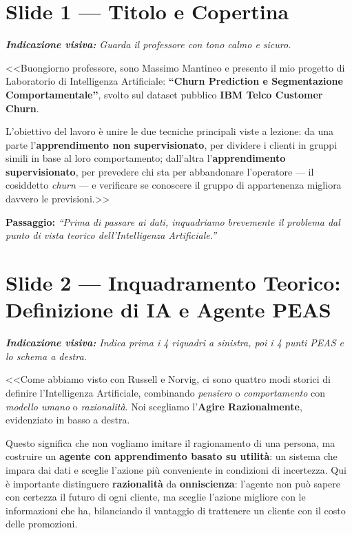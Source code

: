 \documentclass[10pt, a4paper]{article}
\newcommand{\cue}[1]{%
  \par\vspace{1pt}\noindent\colorbox{CueBg}{\parbox{\dimexpr\linewidth-2\fboxsep}{\footnotesize\textit{\color{PrimaryNavy}\textbf{Indicazione visiva:} #1}}}\par\vspace{2pt}%
}
\newcommand{\transition}[1]{%
  \par\vspace{1pt}\noindent\colorbox{LightBg}{\parbox{\dimexpr\linewidth-2\fboxsep}{\small\textbf{\color{SecondaryBlue}Passaggio:} \textit{``#1''}}}\par\vspace{2pt}%
}
\begin{document}
\section*{Slide 1 --- Titolo e Copertina}
\cue{Guarda il professore con tono calmo e sicuro.}
\noindent <<Buongiorno professore, sono Massimo Mantineo e presento il mio progetto di Laboratorio di Intelligenza Artificiale: \textbf{``Churn Prediction e Segmentazione Comportamentale''}, svolto sul dataset pubblico \textbf{IBM Telco Customer Churn}.

L'obiettivo del lavoro è unire le due tecniche principali viste a lezione: da una parte l'\textbf{apprendimento non supervisionato}, per dividere i clienti in gruppi simili in base al loro comportamento; dall'altra l'\textbf{apprendimento supervisionato}, per prevedere chi sta per abbandonare l'operatore --- il cosiddetto \textit{churn} --- e verificare se conoscere il gruppo di appartenenza migliora davvero le previsioni.>>
\transition{Prima di passare ai dati, inquadriamo brevemente il problema dal punto di vista teorico dell'Intelligenza Artificiale.}

\section*{Slide 2 --- Inquadramento Teorico: Definizione di IA e Agente PEAS}
\cue{Indica prima i 4 riquadri a sinistra, poi i 4 punti PEAS e lo schema a destra.}
\noindent <<Come abbiamo visto con Russell e Norvig, ci sono quattro modi storici di definire l'Intelligenza Artificiale, combinando \textit{pensiero} o \textit{comportamento} con \textit{modello umano} o \textit{razionalità}. Noi scegliamo l'\textbf{Agire Razionalmente}, evidenziato in basso a destra.

Questo significa che non vogliamo imitare il ragionamento di una persona, ma costruire un \textbf{agente con apprendimento basato su utilità}: un sistema che impara dai dati e sceglie l'azione più conveniente in condizioni di incertezza. Qui è importante distinguere \textbf{razionalità} da \textbf{onniscienza}: l'agente non può sapere con certezza il futuro di ogni cliente, ma sceglie l'azione migliore con le informazioni che ha, bilanciando il vantaggio di trattenere un cliente con il costo delle promozioni.
\end{document}
